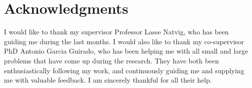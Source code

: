 \section*{Acknowledgments}
I would like to thank my supervisor Professor Lasse Natvig, who has been guiding me during the last months.
I would also like to thank my co-supervisor PhD Antonio Garcia Guirado, who has been helping me with all small and large problems that have come up during the research.
They have both been enthusiastically following my work, and continuously guiding me and supplying me with valuable feedback.
I am sincerely thankful for all their help.
